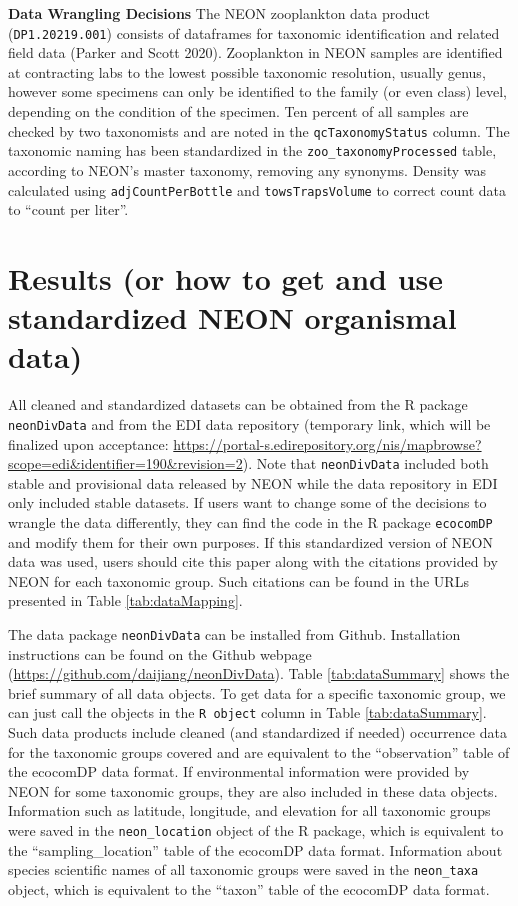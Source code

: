 \documentclass[
  12pt,
]{article}
\begin{document}
\textbf{Data Wrangling Decisions} The NEON zooplankton data product (\texttt{DP1.20219.001}) consists of dataframes for taxonomic identification and related field data (Parker and Scott 2020). Zooplankton in NEON samples are identified at contracting labs to the lowest possible taxonomic resolution, usually genus, however some specimens can only be identified to the family (or even class) level, depending on the condition of the specimen. Ten percent of all samples are checked by two taxonomists and are noted in the \texttt{qcTaxonomyStatus} column. The taxonomic naming has been standardized in the \texttt{zoo\_taxonomyProcessed} table, according to NEON's master taxonomy, removing any synonyms. Density was calculated using \texttt{adjCountPerBottle} and \texttt{towsTrapsVolume} to correct count data to ``count per liter''.

\hypertarget{results-or-how-to-get-and-use-standardized-neon-organismal-data}{%
\section{Results (or how to get and use standardized NEON organismal data)}\label{results-or-how-to-get-and-use-standardized-neon-organismal-data}}

All cleaned and standardized datasets can be obtained from the R package \texttt{neonDivData} and from the EDI data repository (temporary link, which will be finalized upon acceptance: \url{https://portal-s.edirepository.org/nis/mapbrowse?scope=edi\&identifier=190\&revision=2}). Note that \texttt{neonDivData} included both stable and provisional data released by NEON while the data repository in EDI only included stable datasets. If users want to change some of the decisions to wrangle the data differently, they can find the code in the R package \texttt{ecocomDP} and modify them for their own purposes. If this standardized version of NEON data was used, users should cite this paper along with the citations provided by NEON for each taxonomic group. Such citations can be found in the URLs presented in Table \ref{tab:dataMapping}.

The data package \texttt{neonDivData} can be installed from Github. Installation instructions can be found on the Github webpage (\url{https://github.com/daijiang/neonDivData}). Table \ref{tab:dataSummary} shows the brief summary of all data objects. To get data for a specific taxonomic group, we can just call the objects in the \texttt{R\ object} column in Table \ref{tab:dataSummary}. Such data products include cleaned (and standardized if needed) occurrence data for the taxonomic groups covered and are equivalent to the ``observation'' table of the ecocomDP data format. If environmental information were provided by NEON for some taxonomic groups, they are also included in these data objects. Information such as latitude, longitude, and elevation for all taxonomic groups were saved in the \texttt{neon\_location} object of the R package, which is equivalent to the ``sampling\_location'' table of the ecocomDP data format. Information about species scientific names of all taxonomic groups were saved in the \texttt{neon\_taxa} object, which is equivalent to the ``taxon'' table of the ecocomDP data format.
\end{document}
